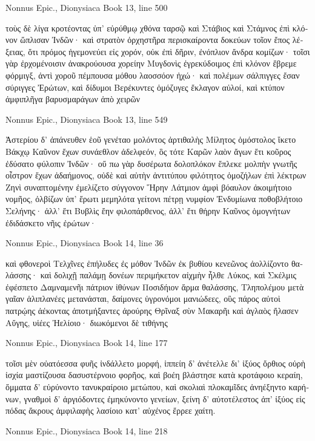 \documentclass[12pt,letterpaper,twoside,final]{memoir}
\begin{document}
\begin{greek}
Nonnus Epic., Dionysiaca 
Book 13, line 500

τοὺς δὲ λίγα κροτέοντας ὑπ' εὐρύθμῳ χθόνα ταρσῷ 
καὶ Στάβιος καὶ Στάμνος ἐπὶ κλόνον ὥπλισαν Ἰνδῶν·   
καὶ στρατὸν ὀρχηστῆρα περισκαίροντα δοκεύων 
τοῖον ἔπος λέξειας, ὅτι πρόμος ἡγεμονεύει 
εἰς χορόν, οὐκ ἐπὶ δῆριν, ἐνόπλιον ἄνδρα κομίζων· 
τοῖσι γὰρ ἐρχομένοισιν ἀνακρούουσα χορείην 
Μυγδονὶς ἐγρεκύδοιμος ἐπὶ κλόνον ἔβρεμε φόρμιγξ, 
ἀντὶ χοροῦ πέμπουσα μόθου λαοσσόον ἠχώ· 
καὶ πολέμων σάλπιγγες ἔσαν σύριγγες Ἐρώτων, 
καὶ δίδυμοι Βερέκυντες ὁμόζυγες ἔκλαγον αὐλοί, 
καὶ κτύπον ἀμφιπλῆγα βαρυσμαράγων ἀπὸ χειρῶν 




Nonnus Epic., Dionysiaca 
Book 13, line 549

Ἀστερίου δ' ἀπάνευθεν ἑοῦ γενέταο μολόντος 
ἀρτιθαλὴς Μίλητος ὁμόστολος ἵκετο Βάκχῳ 
Καῦνον ἔχων συνάεθλον ἀδελφεόν, ὃς τότε Καρῶν 
λαὸν ἄγων ἔτι κοῦρος ἐδύσατο φύλοπιν Ἰνδῶν· 
οὔ πω γὰρ δυσέρωτα δολοπλόκον ἔπλεκε μολπὴν 
γνωτῆς οἶστρον ἔχων ἀδαήμονος, οὐδὲ καὶ αὐτὴν 
ἀντιτύπου φιλότητος ὁμοζήλων ἐπὶ λέκτρων 
Ζηνὶ συναπτομένην ἐμελίζετο σύγγονον Ἥρην 
Λάτμιον ἀμφὶ βόαυλον ἀκοιμήτοιο νομῆος, 
ὀλβίζων ὑπ' ἔρωτι μεμηλότα γείτονι πέτρῃ 
νυμφίον Ἐνδυμίωνα ποθοβλήτοιο Σελήνης· 
ἀλλ' ἔτι Βυβλὶς ἔην φιλοπάρθενος, ἀλλ' ἔτι θήρην 
Καῦνος ὁμογνήτων ἐδιδάσκετο νῆις ἐρώτων· 




Nonnus Epic., Dionysiaca 
Book 14, line 36

καὶ φθονεροὶ Τελχῖνες ἐπήλυδες ἐς μόθον Ἰνδῶν 
ἐκ βυθίου κενεῶνος ἀολλίζοντο θαλάσσης·   
καὶ δολιχῇ παλάμῃ δονέων περιμήκετον αἰχμὴν 
ἦλθε Λύκος, καὶ Σκέλμις ἐφέσπετο Δαμναμενῆι 
πάτριον ἰθύνων Ποσιδήιον ἅρμα θαλάσσης, 
Τληπολέμου μετὰ γαῖαν ἁλιπλανέες μετανάσται, 
δαίμονες ὑγρονόμοι μανιώδεες, οὓς πάρος αὐτοὶ 
πατρῴης ἀέκοντας ἀποτμήξαντες ἀρούρης 
Θρῖναξ σὺν Μακαρῆι καὶ ἀγλαὸς ἤλασεν Αὔγης, 
υἱέες Ἠελίοιο· διωκόμενοι δὲ τιθήνης 




Nonnus Epic., Dionysiaca 
Book 14, line 177

τοῖσι μὲν οὐατόεσσα φυῆς ἰνδάλλετο μορφή, 
ἱππείη δ' ἀνέτελλε δι' ἰξύος ὄρθιος οὐρὴ 
ἰσχία μαστίζουσα δασυστέρνοιο φορῆος, 
καὶ βοέη βλάστησε κατὰ κροτάφοιο κεραίη, 
ὄμματα δ' εὐρύνοντο τανυκραίροιο μετώπου, 
καὶ σκολιαὶ πλοκαμῖδες ἀνηέξηντο καρήνων, 
γναθμοὶ δ' ἀργιόδοντες ἐμηκύνοντο γενείων, 
ξείνη δ' αὐτοτέλεστος ἀπ' ἰξύος εἰς πόδας ἄκρους 
ἀμφιλαφὴς λασίοιο κατ' αὐχένος ἔρρεε χαίτη. 



Nonnus Epic., Dionysiaca 
Book 14, line 218


\end{greek}
\end{document}
